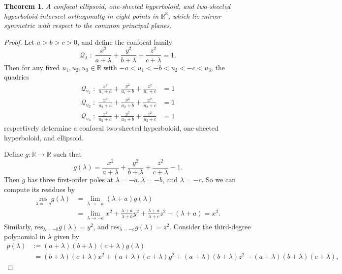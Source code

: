 \documentclass[10pt, a4paper]{article}
\theoremstyle{BoldTopSpacing}
\newtheorem{theorem}{Theorem}[section]
\theoremstyle{BoldTopSpacing}
\theoremstyle{BoldTopSpacing}
\theoremstyle{BoldTopBottomSpacing}
\theoremstyle{BoldTopSpacing}
\theoremstyle{BoldTopBottomSpacing}
\theoremstyle{remark}
\begin{document}
\begin{theorem}
\label{thm:confocal-quadrics-intersect-eight-points}
A confocal ellipsoid, one-sheeted hyperboloid, and two-sheeted hyperboloid intersect orthogonally in eight points in $\mathbb{R}^3$, which lie mirror symmetric with respect to the common principal planes.
\end{theorem}
\begin{proof}
Let $a > b > c > 0$, and define the confocal family
\[
    \mathcal{Q}_{\lambda} \; : \; \frac{x^2}{a + \lambda} + \frac{y^2}{b + \lambda} + \frac{z^2}{c + \lambda} = 1.
\]
Then for any fixed $u_{1}, u_{2}, u_{3} \in \mathbb{R}$ with $-a < u_{1} < -b < u_{2} < -c < u_{3}$, the quadrics
\begin{equation}
\label{eq:the-quadrics-u1u2u3}
\begin{aligned}
\mathcal{Q}_{u_{1}} \; : \; \frac{x^2}{u_{1} + a} + \frac{y^2}{u_{1} + b} + \frac{z^2}{u_{1} + c} &= 1 \\
\mathcal{Q}_{u_{2}}\; : \; \frac{x^2}{u_{2} + a} + \frac{y^2}{u_{2} + b} + \frac{z^2}{u_{2} + c} &= 1 \\
\mathcal{Q}_{u_{3}} \; : \; \frac{x^2}{u_{3} + a} + \frac{y^2}{u_{3} + b} + \frac{z^2}{u_{3} + c} &= 1
\end{aligned}
\end{equation}
respectively determine a confocal two-sheeted hyperboloid, one-sheeted hyperboloid, and ellipsoid. \par
Define $g : \mathbb{R} \to \mathbb{R}$ such that
\[
    g(\lambda) = \frac{x^2}{a + \lambda} + \frac{y^2}{b + \lambda} + \frac{z^2}{c + \lambda} - 1.
\]
Then $g$ has three first-order poles at $\lambda = -a, \lambda = -b$, and $\lambda = -c$. So we can compute its residues by
\begin{align*}
\underset{\lambda = -a}{\text{res}} g(\lambda) &= \lim_{\lambda \to -a} (\lambda + a) g(\lambda) \\
&= \lim_{\lambda \to -a} x^2 + \frac{\lambda + a}{\lambda + b}  y^2 + \frac{\lambda + a}{\lambda + c} z^2 - (\lambda + a) = x^2.
\end{align*}
Similarly, $\text{res}_{\lambda = -b} g(\lambda) = y^2$, and $\text{res}_{\lambda = -c} g(\lambda) = z^2$. Consider the third-degree polynomial in $\lambda$ given by
\begin{align*}
p(\lambda) &:= (a+\lambda)(b+\lambda)(c+\lambda)g(\lambda) \\
&\;= (b+\lambda)(c+\lambda)x^2 + (a+\lambda)(c+\lambda)y^2 + (a+\lambda)(b+\lambda)z^2  - (a+\lambda)(b+\lambda)(c+\lambda),

\end{align*}
\end{proof}
\end{document}
